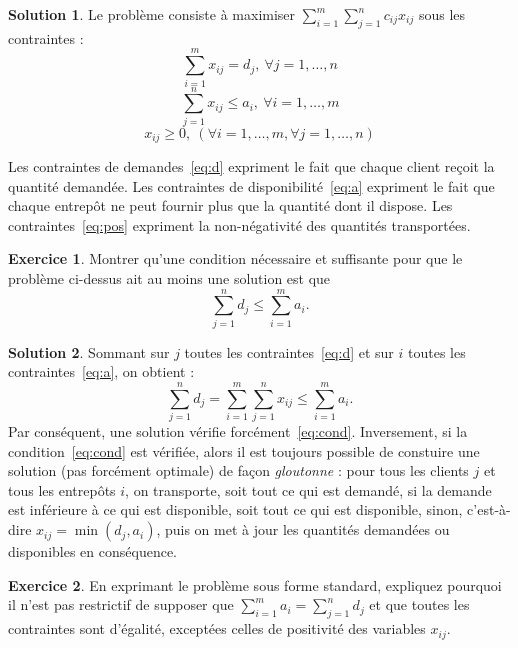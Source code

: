 \documentclass[a4paper,francais]{article}
\theoremstyle{definition}
\newtheorem{exercice}{Exercice}[section]
\newtheorem*{solution}{Solution}
\begin{document}
\begin{solution}
  Le problème consiste à maximiser $\sum_{i = 1}^m \sum_{j = 1}^{n} c_{ij}x_{ij}$ sous les con\-traintes : 
  \begin{equation}
    \label{eq:d}
    \sum_{i = 1}^m x_{ij} = d_j, \ \forall j = 1, \dots, n
  \end{equation}
  \begin{equation}
    \label{eq:a}
    \sum_{j = 1}^n x_{ij} \leq a_i, \ \forall i = 1, \dots, m
  \end{equation}
  \begin{equation}
    \label{eq:pos}
    x_{ij} \geq 0, \ (\forall i = 1, \dots, m, \forall j = 1, \dots, n )
  \end{equation}

  Les contraintes de demandes~\ref{eq:d} expriment le fait que chaque client reçoit la quantité demandée.
  Les contraintes de disponibilité~\ref{eq:a} expriment le fait que chaque entrepôt ne peut fournir plus
  que la quantité dont il dispose. Les con\-traintes~\ref{eq:pos} expriment la non-négativité des quantités
  transportées. 
\end{solution}

\begin{exercice}
  Montrer qu'une condition nécessaire et suffisante pour que le problème ci-dessus ait au
  moins une solution est que
  \begin{equation}
    \label{eq:cond}
    \sum_{j = 1}^n d_j \leq \sum_{i = 1}^m a_i.
  \end{equation}
\end{exercice}

\begin{solution}
  Sommant sur $j$ toutes les contraintes~\ref{eq:d} et sur $i$ toutes les contraintes~\ref{eq:a},
  on obtient :
  \[
  \sum_{j = 1}^n d_j = \sum_{i = 1}^m\sum_{j = 1}^n x_{ij} \leq \sum_{i = 1}^m a_i.
  \]
  Par conséquent, une solution vérifie forcément~\ref{eq:cond}. Inversement,
  si la condition~\ref{eq:cond} est vérifiée, alors il est toujours possible de
  constuire une solution (pas forcément optimale) de façon \emph{gloutonne} :
  pour tous les clients $j$ et tous les entrepôts $i$, on transporte, soit
  tout ce qui est demandé, si la demande est inférieure à ce qui est disponible,
  soit tout ce qui est disponible, sinon, c'est-à-dire $x_{ij} = \min(d_j,a_i)$,
  puis on met à jour les quantités demandées ou disponibles en conséquence. 
\end{solution}

\begin{exercice}
  En exprimant le problème sous forme standard, expliquez pourquoi il n'est pas restrictif
  de supposer que $\sum_{i = 1}^m a_i = \sum_{j = 1}^n d_j$ et que toutes les contraintes
  sont d'égalité, exceptées celles de positivité des variables $x_{ij}$.
\end{exercice}
\end{document}
